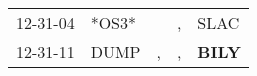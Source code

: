 \begin{supertabular}{p{0.07\textwidth}p{0.06\textwidth}p{0.02\textwidth}p{0.02\textwidth}p{0.06\textwidth}}
 12-31-04\textsuperscript{} &                   *OS3* &    &  , &           SLAC\textsuperscript{} \\
 12-31-11\textsuperscript{} &  DUMP\textsuperscript{} &  , &  , &  \textbf{BILY\textsuperscript{}} \\
\end{supertabular}
